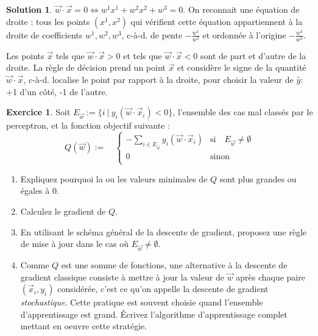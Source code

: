 \documentclass[a4paper,francais]{article}
\theoremstyle{definition}
\newtheorem{exercice}{Exercice}[section]
\newtheorem*{solution}{Solution}
\begin{document}
\begin{solution}
  $\vec{w}\cdot\vec{x} = 0 \Leftrightarrow w^1x^1 + w^2x^2 + w^3 = 0$.
  On reconnait une équation de droite : tous les points $(x^1, x^2)$
  qui vérifient cette équation appartiennent à la droite de coefficients
  $w^1, w^2, w^3$, c-à-d. de pente $-\frac{w^1}{w^2}$ et ordonnée à l'origine
  $-\frac{w^3}{w^2}$.

  Les points $\vec{x}$ tels que $\vec{w}\cdot\vec{x} > 0$ et tels que
  $\vec{w}\cdot\vec{x} < 0$ sont de part et d'autre de la droite. 
  La règle de décision prend un point $\vec{x}$ et considère le signe
  de la quantité $\vec{w}\cdot\vec{x}$, c-à-d. localise le point par
  rapport à la droite, pour choisir la valeur de $\hat{y}$: +1 d'un côté,
  -1 de l'autre. 
\end{solution}

\begin{exercice}
  Soit $E_{\vec{w}} := \{i \ | \ y_i (\vec{w}\cdot\vec{x}_i) < 0\}$,
  l'ensemble des cas mal classés par le perceptron, 
  et la fonction objectif suivante :
  \[
  Q(\vec{w}) :=
  \quad
  \left\{
  \begin{array}{ll}
    - \sum_{i \in E_{\vec{w}}} y_i (\vec{w}\cdot\vec{x}_i) & \text{si}\quad E_{\vec{w}} \neq \emptyset \\
    0 & \text{sinon} \\
  \end{array}
  \right.
  \]

  \begin{enumerate}
  \item Expliquez pourquoi la ou les valeurs minimales de $Q$
    sont plus grandes ou égales à 0. 
  \item Calculez le gradient de $Q$.
  \item En utilisant le schéma général de la descente de gradient,
    proposez une règle de mise à jour dans le cas où $E_{\vec{w}} \neq \emptyset$. 
  \item Comme $Q$ est une somme de fonctions, une alternative à la descente de gradient classique
  consiste à mettre à jour la valeur de $\vec{w}$ après chaque paire $(\vec{x}_i, y_i)$
  considérée, c'est ce qu'on appelle la descente de gradient \emph{stochastique}.
  Cette pratique est souvent choisie quand l'ensemble d'apprentissage est grand.
  \'Ecrivez l'algorithme d'apprentissage complet mettant en oeuvre cette stratégie. 
  \end{enumerate}
\end{exercice}
\end{document}
